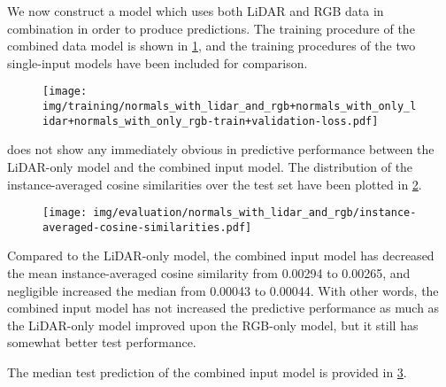 We now construct a model which uses both LiDAR and RGB data in combination in order to produce predictions.
The training procedure of the combined data model is shown in \cref{fig:combined-training}, and the training procedures of the two single-input models have been included for comparison.
%
\begin{figure}[H]
  \texttt{[image: img/training/normals\_with\_lidar\_and\_rgb+normals\_with\_only\_lidar+normals\_with\_only\_rgb-train+validation-loss.pdf]}
  \label{fig:combined-training}
\end{figure}
\noindent
{} does not show any immediately obvious in predictive performance between the LiDAR-only model and the combined input model.
The distribution of the instance-averaged cosine similarities over the test set have been plotted in \cref{fig:combined-test-distribution}.
%
\begin{figure}[H]
  \texttt{[image: img/evaluation/normals\_with\_lidar\_and\_rgb/instance-averaged-cosine-similarities.pdf]}
  \label{fig:combined-test-distribution}
\end{figure}
%
Compared to the LiDAR-only model, the combined input model has decreased the mean instance-averaged cosine similarity from \num{0.00294} to \num{0.00265}, and negligible increased the median from \num{0.00043} to \num{0.00044}.
With other words, the combined input model has not increased the predictive performance as much as the LiDAR-only model improved upon the RGB-only model, but it still has somewhat better test performance.

The median test prediction of the combined input model is provided in \cref{fig:combined-median-prediction}.
%
\begin{figure}[H]
  \label{fig:combined-median-prediction}
\end{figure}
